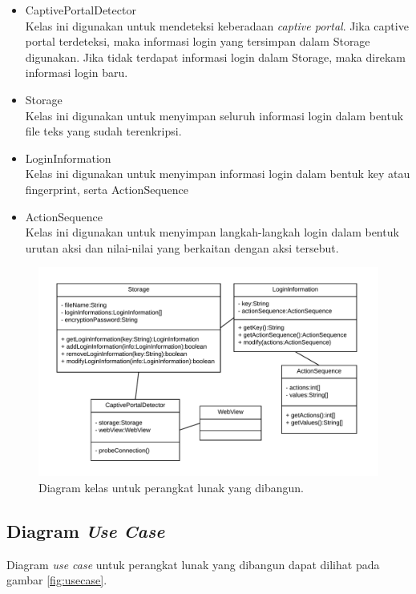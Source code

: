 \begin{itemize}
    \item{CaptivePortalDetector\\Kelas ini digunakan untuk mendeteksi keberadaan \textit{captive portal}. Jika captive portal terdeteksi, maka informasi login yang tersimpan dalam Storage digunakan. Jika tidak terdapat informasi login dalam Storage, maka direkam informasi login baru.}
    \item{Storage\\Kelas ini digunakan untuk menyimpan seluruh informasi login dalam bentuk file teks yang sudah terenkripsi.}
    \item{LoginInformation\\Kelas ini digunakan untuk menyimpan informasi login dalam bentuk key atau fingerprint, serta ActionSequence}
    \item{ActionSequence\\Kelas ini digunakan untuk menyimpan langkah-langkah login dalam bentuk urutan aksi dan nilai-nilai yang berkaitan dengan aksi tersebut.}
\end{itemize}

\begin{figure}[h]
    \centering
    \includegraphics[scale=0.85]{Gambar/classdiagram.png}
    \caption[Diagram kelas untuk perangkat lunak yang dibangun.]{Diagram kelas untuk perangkat lunak yang dibangun.}
    \label{fig:diagramkelas}
\end{figure}

\subsection{Diagram \textit{Use Case}}

Diagram \textit{use case} untuk perangkat lunak yang dibangun dapat dilihat pada gambar \ref{fig:usecase}.

